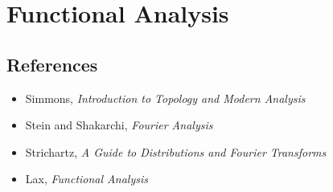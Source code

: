 \section{Functional Analysis}
\subsection*{References}
\begin{itemize}
    \item Simmons, \emph{Introduction to Topology and Modern Analysis}
    \item Stein and Shakarchi, \emph{Fourier Analysis}
    \item Strichartz, \emph{A Guide to Distributions and Fourier Transforms}
    \item Lax, \emph{Functional Analysis}
\end{itemize}
